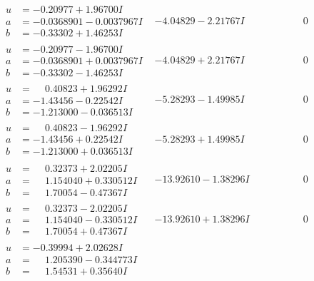 \documentclass[1p]{elsarticle_modified}
\theoremstyle{definition}
\begin{document}
$$\begin{array}{c|c|c}
 \hline 
\begin{aligned}
u &= -0.20977 + 1.96700 I \\
a &= -0.0368901 - 0.0037967 I \\
b &= -0.33302 + 1.46253 I\end{aligned}
 & -4.04829 - 2.21767 I & \phantom{-0.000000 } 0 \\ \hline\begin{aligned}
u &= -0.20977 - 1.96700 I \\
a &= -0.0368901 + 0.0037967 I \\
b &= -0.33302 - 1.46253 I\end{aligned}
 & -4.04829 + 2.21767 I & \phantom{-0.000000 } 0 \\ \hline\begin{aligned}
u &= \phantom{-}0.40823 + 1.96292 I \\
a &= -1.43456 - 0.22542 I \\
b &= -1.213000 - 0.036513 I\end{aligned}
 & -5.28293 - 1.49985 I & \phantom{-0.000000 } 0 \\ \hline\begin{aligned}
u &= \phantom{-}0.40823 - 1.96292 I \\
a &= -1.43456 + 0.22542 I \\
b &= -1.213000 + 0.036513 I\end{aligned}
 & -5.28293 + 1.49985 I & \phantom{-0.000000 } 0 \\ \hline\begin{aligned}
u &= \phantom{-}0.32373 + 2.02205 I \\
a &= \phantom{-}1.154040 + 0.330512 I \\
b &= \phantom{-}1.70054 - 0.47367 I\end{aligned}
 & -13.92610 - 1.38296 I & \phantom{-0.000000 } 0 \\ \hline\begin{aligned}
u &= \phantom{-}0.32373 - 2.02205 I \\
a &= \phantom{-}1.154040 - 0.330512 I \\
b &= \phantom{-}1.70054 + 0.47367 I\end{aligned}
 & -13.92610 + 1.38296 I & \phantom{-0.000000 } 0 \\ \hline\begin{aligned}
u &= -0.39994 + 2.02628 I \\
a &= \phantom{-}1.205390 - 0.344773 I \\
b &= \phantom{-}1.54531 + 0.35640 I\end{aligned}

\end{array}$$
\end{document}

